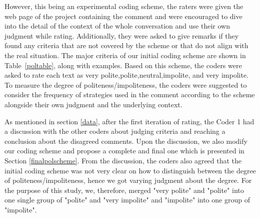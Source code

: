 However, this being an experimental coding scheme, the raters were given the web page of the project containing the comment and were encouraged to dive into the detail of the context of the whole conversation and use their own judgment while rating. Additionally, they were asked to give remarks if they found any criteria that are not covered by the scheme or that do not align with the real situation. The major criteria of our initial coding scheme are shown in Table~\ref{poltable}, along with examples.
Based on this scheme, 
the coders were asked to rate each text as 
very polite,polite,neutral,impolite, and very impolite.
To measure the degree of politeness/impoliteness, 
the coders were suggested to consider 
the frequency of strategies used in the comment 
according to the scheme 
alongside their own judgment and the underlying context.

As mentioned in section \ref{data}, after the first iteration of rating, the Coder 1 had a discussion with the other coders about judging criteria and reaching a conclusion about the disagreed comments. Upon the discussion, we also modify our coding scheme and propose a complete and final one which is presented in Section \ref{finalpolscheme}. From the discussion, the coders also agreed that the initial coding scheme was not very clear on how to distinguish between the degree of politeness/impoliteness, hence we got varying judgment about the degree. For the purpose of this study, we, therefore, merged "very polite" and "polite" into one single group of "polite" and "very impolite" and "impolite" into one group of "impolite".

